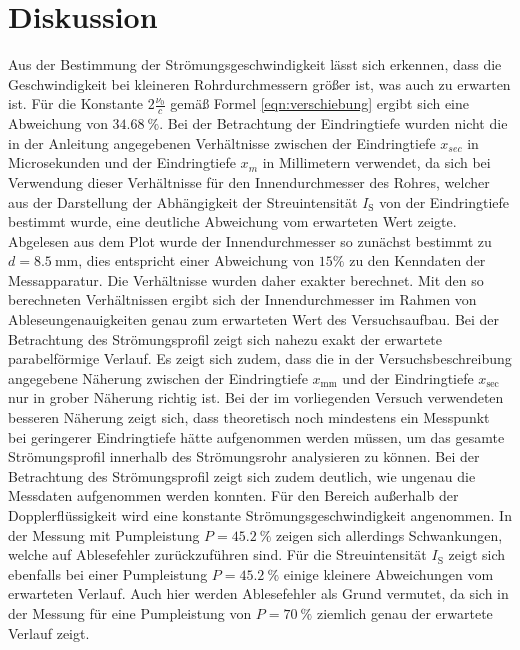 \section{Diskussion}
\label{sec:Diskussion}
Aus der Bestimmung der Strömungsgeschwindigkeit lässt sich erkennen, dass die Geschwindigkeit 
bei kleineren Rohrdurchmessern größer ist, was auch zu erwarten ist.
Für die Konstante $2\frac{\nu_0}{c}$ gemäß Formel \eqref{eqn:verschiebung} ergibt sich eine 
Abweichung von $\SI{34.68}{\percent}$.
Bei der Betrachtung der Eindringtiefe wurden nicht die in der Anleitung angegebenen Verhältnisse zwischen der Eindringtiefe $x_{sec}$ in Microsekunden und der Eindringtiefe $x_{m}$ in Millimetern verwendet, da sich bei Verwendung dieser Verhältnisse für den Innendurchmesser des Rohres, welcher aus der Darstellung der Abhängigkeit der Streuintensität $I_{\mathrm{S}}$ von der Eindringtiefe bestimmt wurde, eine deutliche Abweichung vom erwarteten Wert zeigte.
Abgelesen aus dem Plot wurde der Innendurchmesser so zunächst bestimmt zu $d=\SI{8.5}{\milli\meter}$, dies entspricht einer Abweichung von $15\%$ zu den Kenndaten der Messapparatur.
Die Verhältnisse wurden daher exakter berechnet. Mit den so berechneten Verhältnissen ergibt sich der Innendurchmesser im Rahmen von Ableseungenauigkeiten genau zum erwarteten Wert des Versuchsaufbau.
Bei der Betrachtung des Strömungsprofil zeigt sich nahezu exakt der erwartete parabelförmige Verlauf. Es zeigt sich zudem, dass die in der Versuchsbeschreibung angegebene Näherung zwischen der Eindringtiefe $x_\mathrm{mm}$ und der Eindringtiefe $x_\mathrm{sec}$ nur in grober Näherung richtig ist. Bei der im vorliegenden Versuch verwendeten besseren Näherung zeigt sich, dass theoretisch noch mindestens ein Messpunkt bei geringerer Eindringtiefe hätte aufgenommen werden müssen, um das gesamte Strömungsprofil innerhalb des Strömungsrohr analysieren zu können.
Bei der Betrachtung des Strömungsprofil zeigt sich zudem deutlich, wie ungenau die Messdaten aufgenommen werden konnten. Für den Bereich außerhalb der Dopplerflüssigkeit wird eine konstante Strömungsgeschwindigkeit angenommen. In der Messung mit Pumpleistung $P=\SI{45.2}{\percent}$ zeigen sich allerdings Schwankungen, welche auf Ablesefehler zurückzuführen sind.
Für die Streuintensität $I_\mathrm{S}$ zeigt sich ebenfalls bei einer Pumpleistung $P=\SI{45.2}{\percent}$ einige kleinere Abweichungen vom erwarteten Verlauf. Auch hier werden Ablesefehler als Grund vermutet, da sich in der Messung für eine Pumpleistung von $P=\SI{70}{\percent}$ ziemlich genau der erwartete Verlauf zeigt.
